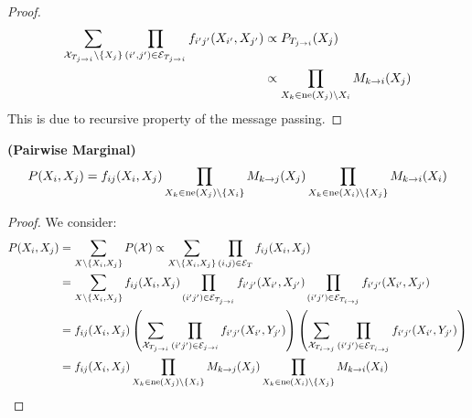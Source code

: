 \begin{proof}
    \begin{equation*}
    \begin{aligned}
        \sum_{\mathcal{X}_{T_{j\rightarrow i}}\backslash \left\{ X_j \right\}} \prod_{(i',j')\in\mathcal{E}_{T_{j\rightarrow i}}} f_{i'j'}(X_{i'}, X_{j'}) &\propto P_{T_{j\rightarrow i}}(X_j) \\
        &\propto \prod_{X_{k}\in\operatorname{ne}(X_j)\backslash X_i} M_{k\rightarrow i}(X_j)
    \end{aligned}
    \end{equation*}
    This is due to recursive property of the message passing.
\end{proof}

\begin{proposition}{\textbf{(Pairwise Marginal)}}
    \begin{equation*}
        P(X_i, X_j) = f_{ij}(X_i,X_j)\prod_{X_k \in \operatorname{ne}
        (X_j)\backslash \left\{ X_i \right\} }M_{k\rightarrow j}(X_j) \prod_{X_k\in\operatorname{ne}(X_i)\backslash\left\{ X_j \right\}} M_{k\rightarrow i}(X_i)
    \end{equation*}
\end{proposition}
\begin{proof}
    We consider:
    \begin{equation*}
    \begin{aligned}
        P(X_i, X_j) &= \sum_{X\backslash\left\{ X_i, X_j \right\}}P(\mathcal{X}) \propto \sum_{X\backslash\left\{ X_i, X_j \right\}}\prod_{(i,j)\in\mathcal{E}_T}f_{ij}(X_i, X_j) \\
        &= \sum_{X\backslash\left\{ X_i, X_j \right\}}f_{ij}(X_i, X_j)\prod_{(i'j')\in\mathcal{E}_{T_{j\rightarrow i}}}f_{i'j'}(X_{i'}, X_{j'})\prod_{(i'j')\in\mathcal{E}_{T_{i\rightarrow j}}}f_{i'j'}(X_{i'}, X_{j'}) \\
        &= f_{ij}(X_i, X_j)\left( \sum_{\mathcal{X}_{T_{j\rightarrow i}}} \prod_{(i'j')\in\mathcal{E}_{j\rightarrow i}} f_{i'j'}(X_{i'}, Y_{j'})  \right)\left(  \sum_{\mathcal{X}_{T_{i\rightarrow j}}}\prod_{(i'j')\in\mathcal{E}_{T_{i\rightarrow j}}} f_{i'j'}(X_{i'}, Y_{j'})  \right) \\
        &= f_{ij}(X_i,X_j)\prod_{X_k \in \operatorname{ne}
        (X_j)\backslash \left\{ X_i \right\} }M_{k\rightarrow j}(X_j) \prod_{X_k\in\operatorname{ne}(X_i)\backslash\left\{ X_j \right\}} M_{k\rightarrow i}(X_i)
    \end{aligned}
    \end{equation*}
\end{proof}

